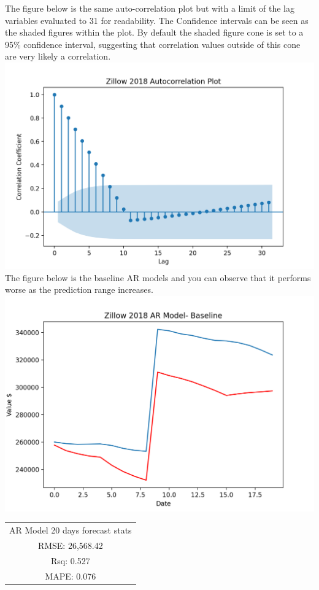 \documentclass{article}
\begin{document}
	The figure below is the same auto-correlation plot but with a limit of the lag variables evaluated to 31 for readability. The Confidence intervals can be seen as the shaded figures within the plot. By default the shaded figure cone is set to a 95\% confidence interval, suggesting that correlation values outside of this cone are very likely a correlation. \\
	
	\includegraphics[scale = 0.2]{../plots/2018/zillow2018_autocorrelation2.png} \\
	
	The figure below is the baseline AR models and you can observe that it performs worse as the prediction range increases. \\
	
	\includegraphics[scale = 0.2]{../plots/2018/zillow2018_AR-model-base20.png}
	\begin{center}
    \begin{tabular}{ c }
     AR Model 20 days forecast stats \\ 
     RMSE: 26,568.42 \\  
     Rsq: 0.527 \\
     MAPE: 0.076 \\
    \end{tabular}
    \end{center}
	
\end{document}
